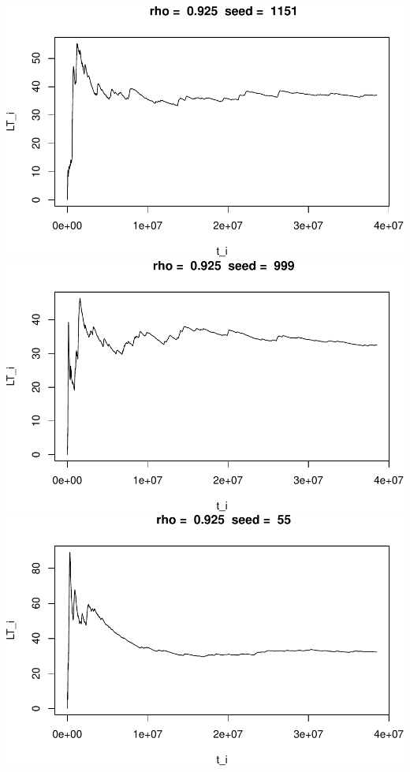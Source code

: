 \documentclass[]{article}
\begin{document}
\includegraphics{003_files/figure-latex/unnamed-chunk-22-4.pdf}
\includegraphics{003_files/figure-latex/unnamed-chunk-22-5.pdf}
\includegraphics{003_files/figure-latex/unnamed-chunk-22-6.pdf}
\end{document}
